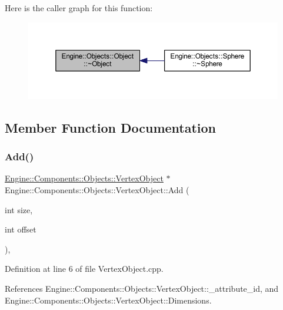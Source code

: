 Here is the caller graph for this function\+:
\nopagebreak
\begin{figure}[H]
\begin{center}
\leavevmode
\includegraphics[width=350pt]{classEngine_1_1Objects_1_1Object_a5fc9cc004cae8e63c4fb1d2b6d1cea88_icgraph}
\end{center}
\end{figure}


\subsection{Member Function Documentation}
\mbox{\label{classEngine_1_1Components_1_1Objects_1_1VertexObject_a18550cae56ca1066792528a7dcf5d28a}} 
\subsubsection{\texorpdfstring{Add()}{Add()}}
{\footnotesize\ttfamily \mbox{\hyperlink{classEngine_1_1Components_1_1Objects_1_1VertexObject}{Engine\+::\+Components\+::\+Objects\+::\+Vertex\+Object}} $\ast$ Engine\+::\+Components\+::\+Objects\+::\+Vertex\+Object\+::\+Add (\begin{DoxyParamCaption}\item[{int}]{size,  }\item[{int}]{offset }\end{DoxyParamCaption})\hspace{0.3cm}{\ttfamily [protected]}, {\ttfamily [inherited]}}



Definition at line 6 of file Vertex\+Object.\+cpp.



References Engine\+::\+Components\+::\+Objects\+::\+Vertex\+Object\+::\+\_\+attribute\+\_\+id, and Engine\+::\+Components\+::\+Objects\+::\+Vertex\+Object\+::\+Dimensions.


